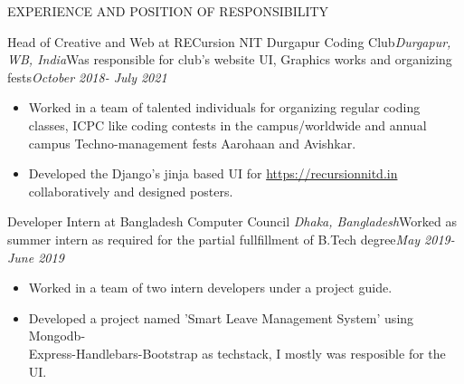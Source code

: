 \documentclass{resume} %
\begin{document}
\begin{rSection}{EXPERIENCE AND POSITION OF RESPONSIBILITY}

\begin{rSubsection}{Head of Creative and Web at RECursion NIT Durgapur Coding Club}{\sl Durgapur, WB, India}{Was responsible for club's website UI, Graphics works and organizing fests}{\sl October 2018- July 2021}
\begin{itemize}[noitemsep,label=\small\textbullet]
\item Worked in a team of talented individuals for organizing regular coding \\classes, ICPC like coding contests in the campus/worldwide and annual \\campus Techno-management fests Aarohaan and Avishkar.
\item Developed the Django's jinja based UI for \href {https://recursionnitd.in}{https://recursionnitd.in} collaboratively and designed posters.
\end{itemize}
\end{rSubsection}  


\begin{rSubsection}{Developer Intern at Bangladesh Computer Council} {\sl Dhaka, Bangladesh}{Worked as summer intern as required for the partial fullfillment of B.Tech degree}{\sl May 2019-June 2019} 
\begin{itemize}[noitemsep,label=\small\textbullet]
\item Worked in a team of two intern developers under a project guide.     
\item Developed a project named 'Smart Leave Management System' using Mongodb-\\Express-Handlebars-Bootstrap as techstack, I mostly was resposible for the UI.
\end{itemize}
\end{rSubsection}

\end{rSection}
  

\end{document}
